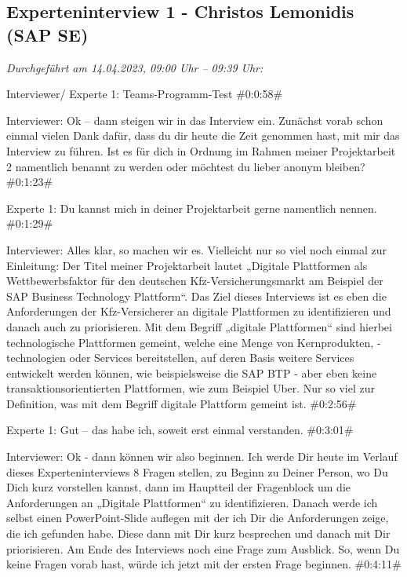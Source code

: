 \subsection{Experteninterview 1 - Christos Lemonidis (SAP SE)}

\textit{Durchgeführt am 14.04.2023, 09:00 Uhr -- 09:39 Uhr:}


Interviewer/ Experte 1:
Teams-Programm-Test 
\#0:0:58\#

Interviewer:
Ok – dann steigen wir in das Interview ein. Zunächst vorab schon einmal vielen Dank dafür, dass du dir heute die Zeit genommen hast, mit mir das Interview zu führen. Ist es für dich in Ordnung im Rahmen meiner Projektarbeit 2 namentlich benannt zu werden oder möchtest du lieber anonym bleiben?
\#0:1:23\#

Experte 1:
Du kannst mich in deiner Projektarbeit gerne namentlich nennen.
\#0:1:29\#

Interviewer:
Alles klar, so machen wir es. Vielleicht nur so viel noch einmal zur Einleitung: Der Titel meiner Projektarbeit lautet „Digitale Plattformen als Wettbewerbsfaktor für den deutschen Kfz-Versicherungsmarkt am Beispiel der SAP Business Technology Plattform“. Das Ziel dieses Interviews ist es eben die Anforderungen der Kfz-Versicherer an digitale Plattformen zu identifizieren und danach auch zu priorisieren. Mit dem Begriff „digitale Plattformen“ sind hierbei technologische Plattformen gemeint, welche eine Menge von Kernprodukten, -technologien oder Services bereitstellen, auf deren Basis weitere Services entwickelt werden können, wie beispielsweise die SAP BTP - aber eben keine transaktionsorientierten Plattformen, wie zum Beispiel Uber. Nur so viel zur Definition, was mit dem Begriff digitale Plattform gemeint ist.
\#0:2:56\#

Experte 1:
Gut – das habe ich, soweit erst einmal verstanden.
\#0:3:01\#

Interviewer:
Ok - dann können wir also beginnen. Ich werde Dir heute im Verlauf dieses Experteninterviews 8 Fragen stellen, zu Beginn zu Deiner Person, wo Du Dich kurz vorstellen kannst, dann im Hauptteil der Fragenblock um die Anforderungen an „Digitale Plattformen“ zu identifizieren. Danach werde ich selbst einen PowerPoint-Slide auflegen mit der ich Dir die Anforderungen zeige, die ich gefunden habe. Diese dann mit Dir kurz besprechen und danach mit Dir priorisieren. Am Ende des Interviews noch eine Frage zum Ausblick. So, wenn Du keine Fragen vorab hast, würde ich jetzt mit der ersten Frage beginnen.
\#0:4:11\#

